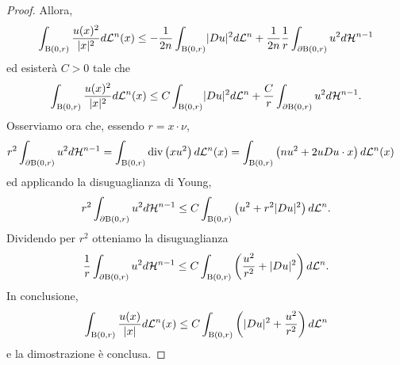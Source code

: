 \begin{proof}
	Allora, 
	\[ \int_{\textup{B}(0,r)}\frac{u(x)^2}{\lvert x\rvert^2} d\mathcal{L}^n(x) \le -\frac{1}{2n}\int_{\textup{B}(0,r)}\lvert Du\rvert^2 d\mathcal{L}^n + \frac{1}{2n}\frac{1}{r}\int_{\partial \textup{B}(0,r)}u^2 d\mathcal{H}^{n-1} \]
	ed esisterà $C> 0$ tale che
	\[ \int_{\textup{B}(0,r)}\frac{u(x)^2}{\lvert x\rvert^2} d\mathcal{L}^n(x) \le C\int_{\textup{B}(0,r)}\lvert Du\rvert^2 d\mathcal{L}^n + \frac{C}{r}\int_{\partial \textup{B}(0,r)}u^2 d\mathcal{H}^{n-1}. \]
	Osserviamo ora che, essendo $r = x \cdot \nu$,
	\begin{align*}
		r^2\int_{\partial \textup{B}(0,r)}u^2 d\mathcal{H}^{n-1} &= \int_{ \textup{B}(0,r)} \textup{div} \left( xu^2\right)  d\mathcal{L}^n(x) = \int_{ \textup{B}(0,r)}\left( nu^2 + 2uDu \cdot x \right) d\mathcal{L}^n(x)
	\end{align*}
	ed applicando la disuguaglianza di Young,
	\[ 	r^2\int_{\partial \textup{B}(0,r)}u^2 d\mathcal{H}^{n-1} \le C\int_{\textup{B}(0,r)} \left( u^2 + r^2\lvert Du\rvert^2 \right) d\mathcal{L}^n. \]
	Dividendo per $r^2$ otteniamo la disuguaglianza
	\[ \frac{1}{r}\int_{\partial \textup{B}(0,r)}u^2 d\mathcal{H}^{n-1} \le C\int_{\textup{B}(0,r)} \left( \frac{u^2}{r^2} + \lvert Du\rvert^2 \right) d\mathcal{L}^n. \]
	In conclusione,
	\[ \int_{\textup{B}(0,r)} \frac{u(x)}{\lvert x\rvert} d\mathcal{L}^n(x) \le C  \int_{\textup{B}(0,r)} \left( \lvert Du\rvert^2 + \frac{u^2}{r^2}\right)  d\mathcal{L}^n \]
	e la dimostrazione è conclusa.
\end{proof}

